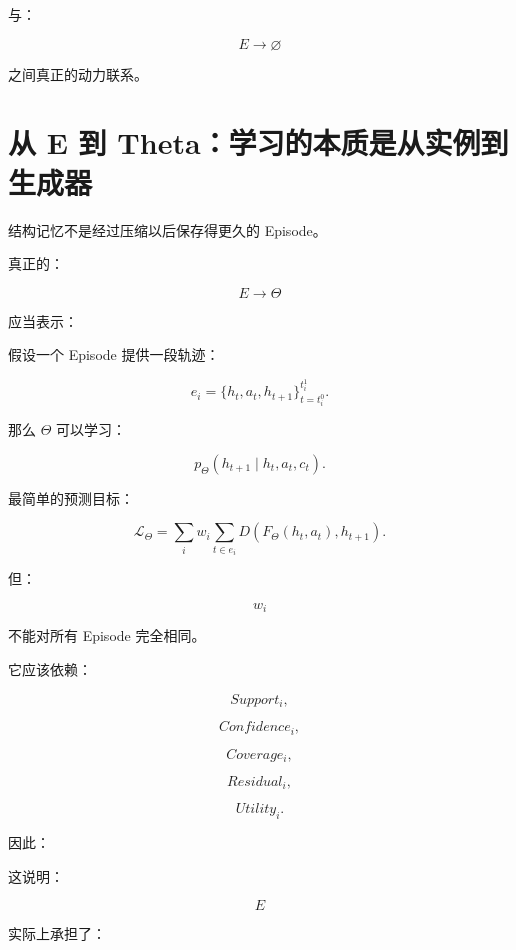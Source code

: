 与：

\[
\boxed{
E\rightarrow\varnothing
}
\]

之间真正的动力联系。


\section{从 E 到 Theta：学习的本质是从实例到生成器}

结构记忆不是经过压缩以后保存得更久的 Episode。

真正的：

\[
E\rightarrow\Theta
\]

应当表示：

\begin{statementbox}
\centering
{}
\end{statementbox}

假设一个 Episode 提供一段轨迹：

\[
e_i
=
\{
h_t,
a_t,
h_{t+1}
\}_{t=t_i^0}^{t_i^1}.
\]

那么 \(\Theta\) 可以学习：

\[
\boxed{
p_{\Theta}
(
h_{t+1}
\mid
h_t,a_t,c_t
).
}
\]

最简单的预测目标：

\[
\mathcal L_{\Theta}
=
\sum_i
w_i
\sum_{t\in e_i}
D
\left(
F_{\Theta}(h_t,a_t),
h_{t+1}
\right).
\]

但：

\[
w_i
\]

不能对所有 Episode 完全相同。

它应该依赖：

\[
Support_i,
\]

\[
Confidence_i,
\]

\[
Coverage_i,
\]

\[
Residual_i,
\]

\[
Utility_i.
\]

因此：

\begin{statementbox}
\centering
{}
\end{statementbox}

这说明：

\[
\boxed{
E
}
\]

实际上承担了：

\begin{statementbox}
\centering
{}
\end{statementbox}


